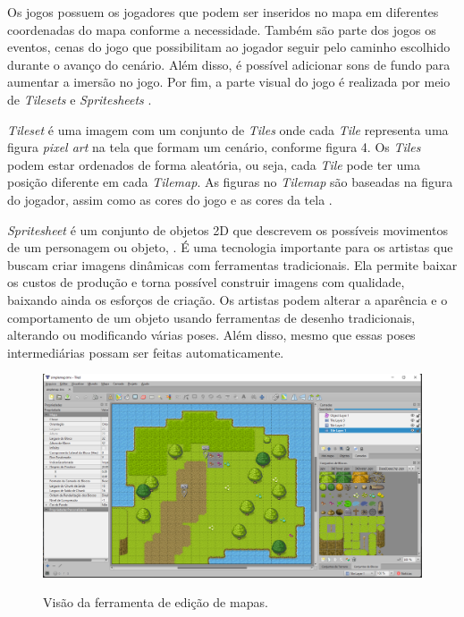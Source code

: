         Os jogos possuem os jogadores que podem ser inseridos no mapa em diferentes coordenadas do mapa conforme a
        necessidade. Também são parte dos jogos os eventos, cenas do jogo que possibilitam ao jogador seguir pelo
        caminho escolhido durante o avanço do cenário. Além disso, é possível adicionar sons de fundo para aumentar a
        imersão no jogo. Por fim, a parte visual do jogo é realizada por meio de \textit{Tilesets} e \textit{Spritesheets}
        \cite{Documentacao_RPGJs}.

        \textit{Tileset} é uma imagem com um conjunto de \textit{Tiles} onde cada \textit{Tile} representa uma figura
        \textit{pixel art} na tela que formam um cenário, conforme figura 4. Os \textit{Tiles} podem estar ordenados de
        forma aleatória, ou seja, cada \textit{Tile} pode ter uma posição diferente em cada \textit{Tilemap}. As figuras
        no \textit{Tilemap} são baseadas na figura do jogador, assim como as cores do jogo e as cores da tela
        \cite{borges2021desenvolvimento}.

        \textit{Spritesheet}  é um conjunto de objetos 2D que descrevem os possíveis movimentos de um personagem ou
        objeto, . É uma tecnologia importante para os artistas que buscam criar imagens dinâmicas com ferramentas
        tradicionais. Ela permite baixar os custos de produção e torna possível construir imagens com qualidade, baixando ainda os
        esforços de criação. Os artistas podem alterar a aparência e o comportamento de um objeto usando ferramentas de
        desenho tradicionais, alterando ou modificando várias poses. Além disso, mesmo que essas poses intermediárias
        possam ser feitas automaticamente\cite{jones2013dynamic}.

        \begin{figure}
            \centering
            \caption{Visão da ferramenta de edição de mapas.}
            \includegraphics[scale=0.3]{Textuais/Pictures/Picture4.png}
            \label{fig:figure-4}
        \end{figure}

